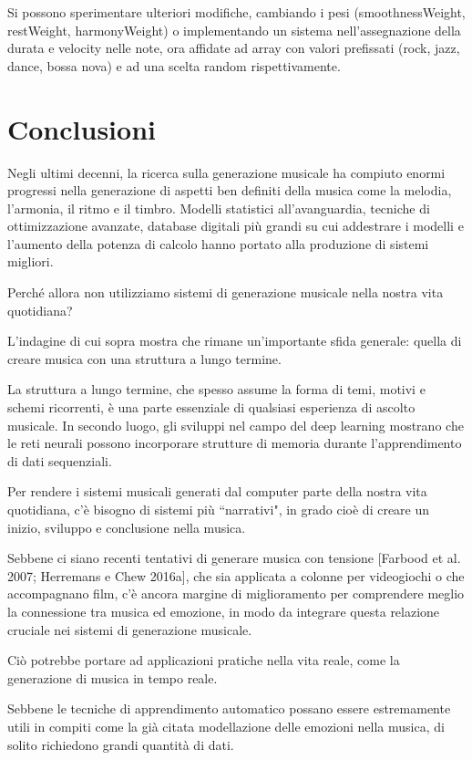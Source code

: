 \documentclass[a4paper,12pt]{report}
\begin{document}
Si possono sperimentare ulteriori modifiche, cambiando i pesi (smoothnessWeight, restWeight, harmonyWeight) o implementando un sistema nell'assegnazione della durata e velocity nelle note, ora affidate ad array con valori prefissati (rock, jazz, dance, bossa nova) e ad una scelta random rispettivamente.

\chapter{Conclusioni}

Negli ultimi decenni, la ricerca sulla generazione musicale ha compiuto enormi progressi nella generazione di aspetti ben definiti della musica come la melodia, l’armonia, il ritmo e il timbro. 
Modelli statistici all’avanguardia, tecniche di ottimizzazione avanzate, database digitali più grandi su cui addestrare i modelli e l’aumento della potenza di calcolo hanno portato alla produzione di sistemi migliori. 

Perché allora non utilizziamo sistemi di generazione musicale nella nostra vita quotidiana? 

L’indagine di cui sopra mostra che rimane un’importante sfida generale: quella di creare musica con una struttura a lungo termine.

La struttura a lungo termine, che spesso assume la forma di temi, motivi e schemi ricorrenti, è una parte essenziale di qualsiasi esperienza di ascolto musicale. In secondo luogo, gli sviluppi nel campo del deep learning mostrano che le reti neurali possono incorporare strutture di memoria durante l'apprendimento di dati sequenziali. 

Per rendere i sistemi musicali generati dal computer parte della nostra vita quotidiana, c’è bisogno di sistemi più “narrativi", in grado cioè di creare un inizio, sviluppo e conclusione nella musica. 

Sebbene ci siano recenti tentativi di generare musica con tensione [Farbood et al. 2007; Herremans e Chew 2016a], che sia applicata a colonne per videogiochi o che accompagnano film, c’è ancora margine di miglioramento per comprendere meglio la connessione tra musica ed emozione, 
in modo da integrare questa relazione cruciale nei sistemi di generazione musicale. 

Ciò potrebbe portare ad applicazioni pratiche nella vita reale, come la generazione di musica in tempo reale.

Sebbene le tecniche di apprendimento automatico possano essere estremamente utili in compiti come la già citata modellazione delle emozioni nella musica, di solito richiedono grandi quantità di dati. 
\end{document}

